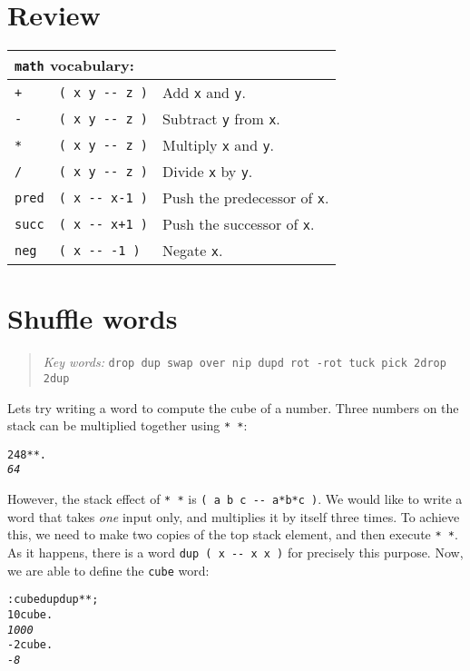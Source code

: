 \documentclass[english]{book}
\newcommand{\chapkeywords}[1]{%
\begin{quote}
\emph{Key words:} \texttt{#1}
\end{quote}
}
\newcommand{\wordtable}[1]{{
\begin{tabularx}{12cm}{|l l X|}
#1
\hline
\end{tabularx}}}
\newcommand{\tabvocab}[1]{
\hline
\multicolumn{3}{|l|}{
\rule[-2mm]{0mm}{6mm}
\texttt{#1} vocabulary:}
\\
\hline
}
\begin{document}
\section*{Review}

\wordtable{
\tabvocab{math}
\texttt{+}&
\texttt{( x y -{}- z )}&
Add \texttt{x} and \texttt{y}.\\
\texttt{-}&
\texttt{( x y -{}- z )}&
Subtract \texttt{y} from \texttt{x}.\\
\texttt{*}&
\texttt{( x y -{}- z )}&
Multiply \texttt{x} and \texttt{y}.\\
\texttt{/}&
\texttt{( x y -{}- z )}&
Divide \texttt{x} by \texttt{y}.\\
\texttt{pred}&
\texttt{( x -{}- x-1 )}&
Push the predecessor of \texttt{x}.\\
\texttt{succ}&
\texttt{( x -{}- x+1 )}&
Push the successor of \texttt{x}.\\
\texttt{neg}&
\texttt{( x -{}- -1 )}&
Negate \texttt{x}.\\
}

\section{Shuffle words}

\chapkeywords{drop dup swap over nip dupd rot -rot tuck pick 2drop 2dup}

Lets try writing a word to compute the cube of a number. 
Three numbers on the stack can be multiplied together using \texttt{{*}
{*}}:

\begin{alltt}
2 4 8 {*} {*} .
\emph{64}
\end{alltt}

However, the stack effect of \texttt{{*} {*}} is \texttt{( a b c -{}-
a{*}b{*}c )}. We would like to write a word that takes \emph{one} input
only, and multiplies it by itself three times. To achieve this, we need to make two copies of the top stack element, and then execute \texttt{{*} {*}}. As it happens, there is a word \texttt{dup ( x -{}-
x x )} for precisely this purpose. Now, we are able to define the
\texttt{cube} word:

\begin{alltt}
: cube dup dup {*} {*} ;
10 cube .
\emph{1000}
-2 cube .
\emph{-8}
\end{alltt}
\end{document}
